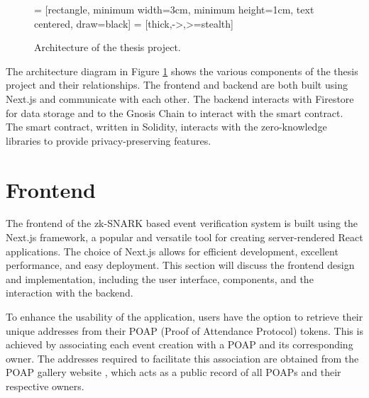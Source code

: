 \begin{figure}[ht]
\centering
\usetikzlibrary{positioning}
 = [rectangle, minimum width=3cm, minimum height=1cm, text centered, draw=black]
 = [thick,->,>=stealth]

\caption{Architecture of the thesis project.}
\label{fig:thesis_architecture}
\end{figure}

The architecture diagram in Figure \ref{fig:thesis_architecture} shows the various components of the thesis project and their relationships. The frontend and backend are both built using Next.js and communicate with each other. The backend interacts with Firestore for data storage and to the Gnosis Chain to interact with the smart contract. The smart contract, written in Solidity, interacts with the zero-knowledge libraries to provide privacy-preserving features.

\section{Frontend}

The frontend of the zk-SNARK based event verification system is built using the Next.js framework, a popular and versatile tool for creating server-rendered React applications. The choice of Next.js allows for efficient development, excellent performance, and easy deployment. This section will discuss the frontend design and implementation, including the user interface, components, and the interaction with the backend.

To enhance the usability of the application, users have the option to retrieve their unique addresses from their POAP (Proof of Attendance Protocol) tokens. This is achieved by associating each event creation with a POAP and its corresponding owner. The addresses required to facilitate this association are obtained from the POAP gallery website \cite{poapWebsite}, which acts as a public record of all POAPs and their respective owners.

